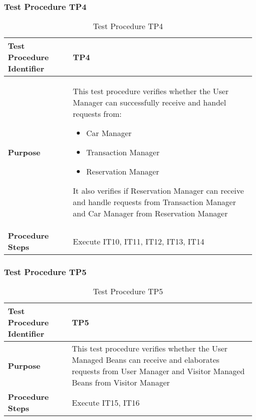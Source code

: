 \subsubsection{Test Procedure TP4} \label{sssec:TP4}
\vspace{10pt}
\begin{table}[htbp]
\begin{center}
\renewcommand{\arraystretch}{1.5}
\begin{tabular}{l|p{}}
\hline
\textbf{Test Procedure Identifier} & TP4\\
\hline
\textbf{Purpose} &  \begin{minipage}[t]{0.6\textwidth}
This test procedure verifies whether the User Manager can successfully receive and handel requests from:
\begin{itemize}
\addtolength{\itemindent}{0.5cm}
\item Car Manager
\item Transaction Manager
\item Reservation Manager
\vspace{2,5mm}
\end{itemize}
It also verifies if Reservation Manager can receive and handle requests from Transaction Manager and Car Manager from Reservation Manager
\end{minipage} \\
\hline
\textbf{Procedure Steps} & Execute IT10, IT11, IT12, IT13, IT14 \\
\hline
\end{tabular}
\caption{Test Procedure TP4}
\end{center}
\end{table}


\subsubsection{Test Procedure TP5} \label{sssec:TP5}
\vspace{16pt}
\begin{table}[htbp]
\begin{center}
\renewcommand{\arraystretch}{1.5}
\begin{tabular}{l|p{}}
\hline
\textbf{Test Procedure Identifier} & TP5\\
\hline
\textbf{Purpose} &  This test procedure verifies whether the User Managed Beans can receive and elaborates requests from User Manager and Visitor Managed Beans from Visitor Manager \\
\hline
\textbf{Procedure Steps} & Execute IT15, IT16 \\
\hline
\end{tabular}
\caption{Test Procedure TP5}
\end{center}
\end{table}